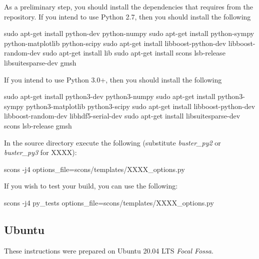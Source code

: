 \documentclass{esysdoc}
\begin{document}
\noindent As a preliminary step, you should install the dependencies that \esfinley requires from the repository.
If you intend to use Python 2.7, then you should install the following
\begin{shellCode}
sudo apt-get install python-dev python-numpy
sudo apt-get install python-sympy python-matplotlib python-scipy
sudo apt-get install libboost-python-dev libboost-random-dev
sudo apt-get install lib
sudo apt-get install scons lsb-release libsuitesparse-dev gmsh
\end{shellCode}

\noindent If you intend to use Python 3.0+, then you should install the following
\begin{shellCode}
sudo apt-get install python3-dev python3-numpy
sudo apt-get install python3-sympy python3-matplotlib python3-scipy
sudo apt-get install libboost-python-dev libboost-random-dev libhdf5-serial-dev
sudo apt-get install libsuitesparse-dev scons lsb-release gmsh
\end{shellCode}

\noindent In the source directory execute the following (substitute \textit{buster_py2} or \textit{buster_py3} for XXXX):
\begin{shellCode}
scons -j4 options_file=scons/templates/XXXX_options.py
\end{shellCode}

\noindent If you wish to test your build, you can use the following:
\begin{shellCode}
scons -j4 py_tests options_file=scons/templates/XXXX_options.py
\end{shellCode}


\subsection{Ubuntu}\label{sec:ubsrc}
These instructions were prepared on Ubuntu 20.04 LTS \textit{Focal Fossa}. \newline


\end{document}
